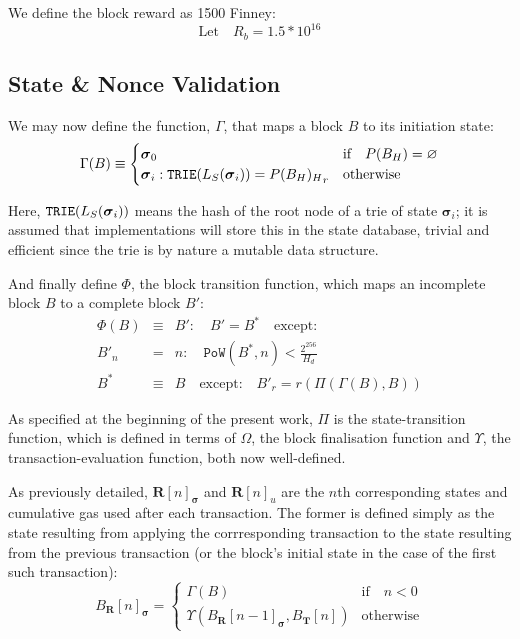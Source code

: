 \documentclass[9pt,oneside]{amsart}
\begin{document}
\begin{multicols}{2}
We define the block reward as 1500 Finney:
\begin{equation}
\text{Let} \quad R_b = 1.5 * 10^{16}
\end{equation}

\subsection{State \& Nonce Validation}

We may now define the function, $\Gamma$, that maps a block $B$ to its initiation state:
\begin{equation}
\Gamma(B) \equiv \begin{cases}
\boldsymbol{\sigma}_0 & \text{if} \quad P(B_H) = \varnothing \\
\boldsymbol{\sigma}_i: \mathtt{\small TRIE}(L_S(\boldsymbol{\sigma}_i)) = {P(B_H)_H}_r & \text{otherwise}
\end{cases}
\end{equation}

Here, $\mathtt{\small TRIE}(L_S(\boldsymbol{\sigma}_i))$ means the hash of the root node of a trie of state $\boldsymbol{\sigma}_i$; it is assumed that implementations will store this in the state database, trivial and efficient since the trie is by nature a mutable data structure.

And finally define $\Phi$, the block transition function, which maps an incomplete block $B$ to a complete block $B'$:
\begin{eqnarray}
\Phi(B) & \equiv & B': \quad B' = B^* \quad \text{except:} \\
B'_n & = & n: \quad \mathtt{PoW}(B^*, n) < \frac{2^{256}}{H_d} \\
B^* & \equiv & B \quad \text{except:} \quad B'_r = r(\Pi(\Gamma(B), B))
\end{eqnarray}

As specified at the beginning of the present work, $\Pi$ is the state-transition function, which is defined in terms of $\Omega$, the block finalisation function and $\Upsilon$, the transaction-evaluation function, both now well-defined.

As previously detailed, $\mathbf{R}[n]_{\boldsymbol{\sigma}}$ and $\mathbf{R}[n]_u$ are the $n$th corresponding states and cumulative gas used after each transaction. The former is defined simply as the state resulting from applying the corrresponding transaction to the state resulting from the previous transaction (or the block's initial state in the case of the first such transaction):
\begin{equation}
B_\mathbf{R}[n]_{\boldsymbol{\sigma}} = \begin{cases} \Gamma(B) & \text{if} \quad n < 0 \\ \Upsilon(B_\mathbf{R}[n - 1]_{\boldsymbol{\sigma}}, B_\mathbf{T}[n]) & \text{otherwise} \end{cases}
\end{equation}


\end{multicols}
\end{document}
